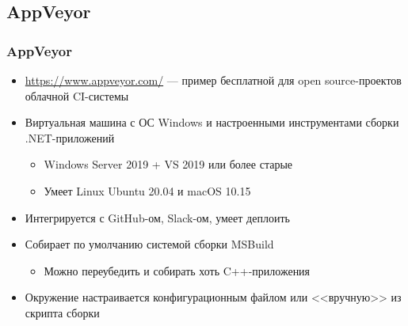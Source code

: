 \documentclass[xetex,mathserif,serif]{beamer}
\begin{document}
    \subsection{AppVeyor}

    \begin{frame}
        \frametitle{AppVeyor}
        \begin{itemize}
            \item \url{https://www.appveyor.com/} --- пример бесплатной для open source-проектов облачной CI-системы
            \item Виртуальная машина с ОС Windows и настроенными инструментами сборки .NET-приложений
            \begin{itemize}
                \item Windows Server 2019 + VS 2019 или более старые
                \item Умеет Linux Ubuntu 20.04 и macOS 10.15
            \end{itemize}
            \item Интегрируется с GitHub-ом, Slack-ом, умеет деплоить
            \item Собирает по умолчанию системой сборки MSBuild
            \begin{itemize}
                \item Можно переубедить и собирать хоть C++-приложения
            \end{itemize}
            \item Окружение настраивается конфигурационным файлом или <<вручную>> из скрипта сборки
        \end{itemize}
    \end{frame}
\end{document}
